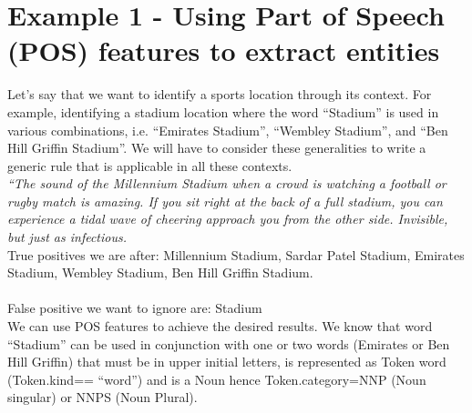 \documentclass[a4paper,12pt]{report}
\begin{document}
\section{Example 1 - Using Part of Speech (POS) features to extract entities}

Let’s say that we want to identify a sports location through its context. For example,
identifying a stadium location where the word “Stadium” is used in various
combinations, i.e. “Emirates Stadium”, “Wembley Stadium”, and “Ben Hill Griffin
Stadium”. We will have to consider these generalities to write a generic rule that is
applicable in all these contexts.\\


\textit{“The sound of the Millennium Stadium when a crowd is watching a football or rugby
match is amazing. If you sit right at the back of a full stadium, you can experience a
tidal wave of cheering approach you from the other side. Invisible, but just as infectious.}
\\


True positives we are after: Millennium Stadium, Sardar Patel Stadium, Emirates Stadium, Wembley Stadium, Ben Hill Griffin Stadium.
\\
\\
False positive we want to ignore are: Stadium
\\
We can use POS features to achieve the desired results. We know that word
“Stadium” can be used in conjunction with one or two words (Emirates or Ben Hill
Griffin) that must be in upper initial letters, is represented as Token word
(Token.kind== “word”) and is a Noun hence Token.category=NNP (Noun singular)
or NNPS (Noun Plural).
\\\\
\end{document}
